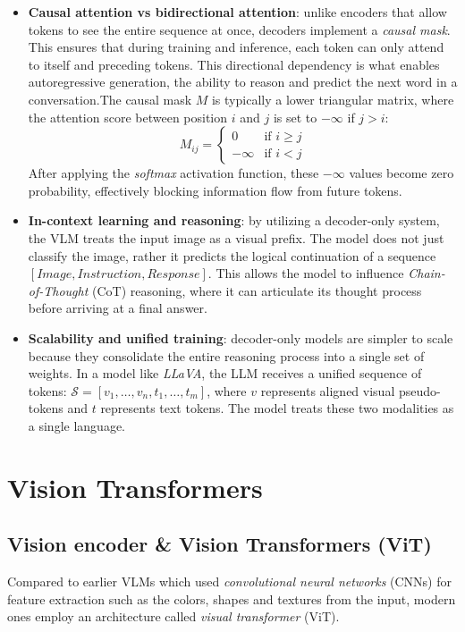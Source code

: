 \begin{itemize}
	\item \textbf{Causal attention vs bidirectional attention}: unlike encoders that allow tokens to see the entire sequence at once, decoders implement a \textit{causal mask}. This ensures that during training and inference, each token can only attend to itself and preceding tokens. This directional dependency is what enables autoregressive generation, the ability to reason and predict the next word in a conversation.The causal mask $M$ is typically a lower triangular matrix, where the attention score between position $i$ and $j$ is set to $-\infty$ if $j > i$:
	\[ M_{ij} = \begin{cases} 0 & \text{if } i \geq j \\ -\infty & \text{if } i < j \end{cases} \]
	After applying the \textit{softmax} activation function, these $-\infty$ values become zero probability, effectively blocking information flow from future tokens.
	
	\item \textbf{In-context learning and reasoning}: by utilizing a decoder-only system, the VLM treats the input image as a visual prefix. The model does not just classify the image, rather it predicts the logical continuation of a sequence $[Image, Instruction, Response]$. This allows the model to influence \textit{Chain-of-Thought} (CoT) reasoning, where it can articulate its thought process before arriving at a final answer.
	
	\item \textbf{Scalability and unified training}: decoder-only models are simpler to scale because they consolidate the entire reasoning process into a single set of weights. In a model like \textit{LLaVA}, the LLM receives a unified sequence of tokens: $\mathcal{S} = [v_1, \dots, v_n, t_1, \dots, t_m]$, where $v$ represents aligned visual pseudo-tokens and $t$ represents text tokens. The model treats these two modalities as a single language.
\end{itemize}


\section{Vision Transformers}
\subsection{Vision encoder \& Vision Transformers (ViT)} 
Compared to earlier VLMs which used \textit{convolutional neural networks} (CNNs) for feature extraction such as the colors, shapes and textures from the input, modern ones employ an architecture called \textit{visual transformer} (ViT). 

